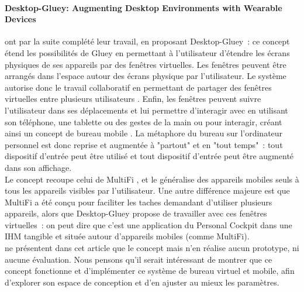 
\paragraph*{\foreignlanguage{english}{Desktop-Gluey: Augmenting Desktop Environments with Wearable Devices}}
\citet{SerranoEnsYangEtAl2015b} ont par la suite complété leur travail, en proposant Desktop-Gluey~: ce concept étend les possibilités de Gluey en permettant à l'utilisateur d'étendre les écrans physiques de ses appareils par des fenêtres virtuelles. Les fenêtres peuvent être arrangés dans l'espace autour des écrans physique par l'utilisateur. Le système autorise donc le travail collaboratif en permettant de partager des fenêtres virtuelles entre plusieurs utilisateurs . Enfin, les fenêtres peuvent suivre l'utilisateur dans ses déplacements et lui permettre d'interagir avec en utilisant son téléphone, une tablette ou des gestes de la main ou pour interagir, créant ainsi un concept de bureau mobile . La métaphore du bureau sur l'ordinateur personnel est donc reprise et augmentée à "partout" et en "tout temps"~: tout dispositif d'entrée peut être utilisé et tout dispositif d'entrée peut être augmenté dans son affichage.\\
Le concept recoupe celui de MultiFi \citep{GrubertHeinischQuigleyEtAl2015}, et le généralise des appareils mobiles seuls à tous les appareils visibles par l'utilisateur. Une autre différence majeure est que MultiFi a été conçu pour faciliter les taches demandant d'utiliser plusieurs appareils, alors que Desktop-Gluey propose de travailler avec ces fenêtres virtuelles~: on peut dire que c'est une application du Personal Cockpit \citep{EnsFinneganIrani2014} dans une IHM tangible et située autour d'appareils mobiles (comme MultiFi).\\
\citeauthor{SerranoEnsYangEtAl2015b} ne présentent dans cet article que le concept mais n'en réalise aucun prototype, ni aucune évaluation. Nous pensons qu'il serait intéressant de montrer que ce concept fonctionne et d'implémenter ce système de bureau virtuel et mobile, afin d'explorer son espace de conception et d'en ajuster au mieux les paramètres.


